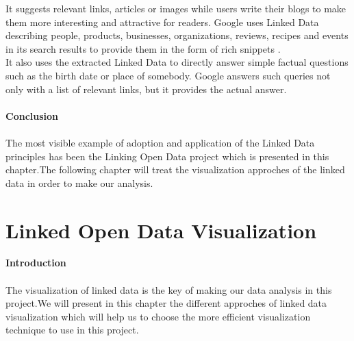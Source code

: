 \documentclass[a4paper,12pt,oneside]{report}
\begin{document}
{{{{It suggests relevant links, articles or images while users write their blogs to make them more interesting and attractive for readers. Google uses Linked Data describing people, products, businesses, organizations, reviews, recipes and events in its search results to provide them in the form of rich snippets .\\
 It also uses the extracted Linked Data to directly answer simple factual questions such as the birth date or place of somebody. Google answers such queries not only with a list of relevant links, but it provides the actual answer.}\\ \\
\textbf{\large Conclusion}\\ \\
{The most visible example of adoption and application of the Linked Data principles has been the Linking Open Data project which is presented in this chapter.The following chapter will treat the visualization approches of the linked data in order to make our analysis. }

\chapter{Linked Open Data Visualization }
\textbf{\large Introduction}\\ \\
{The visualization of linked data is the key of making our data analysis in this project.We will present in this chapter the different approches of  linked data visualization which will help us to choose the  more efficient visualization technique to use in this project. }
}}}
\end{document}
